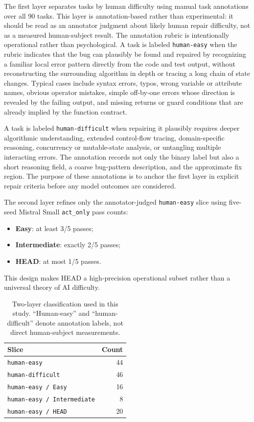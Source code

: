 \documentclass{article}
\begin{document}
The first layer separates tasks by human difficulty using manual task annotations over all 90 tasks. This layer is annotation-based rather than experimental: it should be read as an annotator judgment about likely human repair difficulty, not as a measured human-subject result. The annotation rubric is intentionally operational rather than psychological. A task is labeled \texttt{human-easy} when the rubric indicates that the bug can plausibly be found and repaired by recognizing a familiar local error pattern directly from the code and test output, without reconstructing the surrounding algorithm in depth or tracing a long chain of state changes. Typical cases include syntax errors, typos, wrong variable or attribute names, obvious operator mistakes, simple off-by-one errors whose direction is revealed by the failing output, and missing returns or guard conditions that are already implied by the function contract.

A task is labeled \texttt{human-difficult} when repairing it plausibly requires deeper algorithmic understanding, extended control-flow tracing, domain-specific reasoning, concurrency or mutable-state analysis, or untangling multiple interacting errors. The annotation records not only the binary label but also a short reasoning field, a coarse bug-pattern description, and the approximate fix region. The purpose of these annotations is to anchor the first layer in explicit repair criteria before any model outcomes are considered.

The second layer refines only the annotator-judged \texttt{human-easy} slice using five-seed Mistral Small \texttt{act\_only} pass counts:
\begin{itemize}
    \item \textbf{Easy}: at least 3/5 passes;
    \item \textbf{Intermediate}: exactly 2/5 passes;
    \item \textbf{HEAD}: at most 1/5 passes.
\end{itemize}

This design makes HEAD a high-precision operational subset rather than a universal theory of AI difficulty.

\begin{table}[t]
\centering
\caption{Two-layer classification used in this study. ``Human-easy'' and ``human-difficult'' denote annotation labels, not direct human-subject measurements.}
\label{tab:classification}
\begin{tabular}{lr}
\toprule
Slice & Count \\
\midrule
\texttt{human-easy} & 44 \\
\texttt{human-difficult} & 46 \\
\texttt{human-easy / Easy} & 16 \\
\texttt{human-easy / Intermediate} & 8 \\
\texttt{human-easy / HEAD} & 20 \\
\bottomrule
\end{tabular}
\end{table}
\end{document}
